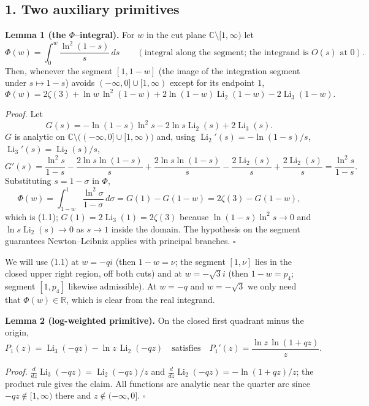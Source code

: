 \documentclass[11pt]{article}
\theoremstyle{remark}
\begin{document}
\subsection*{1. Two auxiliary primitives}

\textbf{Lemma 1 (the $\Phi$--integral).} For $w$ in the cut plane $\mathbb C\setminus[1,\infty)$ let
\[
\Phi(w)=\int_0^w\frac{\ln^2(1-s)}{s}\,ds \qquad(\text{integral along the segment; the integrand is }O(s)\text{ at }0).
\]
Then, whenever the segment $[1,1-w]$ (the image of the integration segment under $s\mapsto 1-s$) avoids $(-\infty,0]\cup[1,\infty)$ except for its endpoint $1$,
\begin{equation*}
\Phi(w)=2\zeta(3)+\ln w\,\ln^2(1-w)+2\ln(1-w)\operatorname{Li}_2(1-w)-2\operatorname{Li}_3(1-w). \tag{1.1}
\end{equation*}

\textit{Proof.} Let
\[
G(s)=-\ln(1-s)\ln^2 s-2\ln s\operatorname{Li}_2(s)+2\operatorname{Li}_3(s).
\]
$G$ is analytic on $\mathbb C\setminus\big((-\infty,0]\cup[1,\infty)\big)$ and, using $\operatorname{Li}_2'(s)=-\ln(1-s)/s$, $\operatorname{Li}_3'(s)=\operatorname{Li}_2(s)/s$,
\[
G'(s)=\frac{\ln^2s}{1-s}-\frac{2\ln s\ln(1-s)}{s}+\frac{2\ln s\ln(1-s)}{s}
-\frac{2\operatorname{Li}_2(s)}{s}+\frac{2\operatorname{Li}_2(s)}{s}=\frac{\ln^2 s}{1-s}.
\]
Substituting $s=1-\sigma$ in $\Phi$,
\[
\Phi(w)=\int_{1-w}^{1}\frac{\ln^2\sigma}{1-\sigma}\,d\sigma=G(1)-G(1-w)=2\zeta(3)-G(1-w),
\]
which is (1.1); $G(1)=2\operatorname{Li}_3(1)=2\zeta(3)$ because $\ln(1-s)\ln^2s\to0$ and $\ln s\operatorname{Li}_2(s)\to 0$ as $s\to1$ inside the domain. The hypothesis on the segment guarantees Newton--Leibniz applies with principal branches. $\square$

We will use (1.1) at $w=-qi$ (then $1-w=\nu$; the segment $[1,\nu]$ lies in the closed upper right region, off both cuts) and at $w=-\sqrt3 i$ (then $1-w=p_4$; segment $[1,p_4]$ likewise admissible). At $w=-q$ and $w=-\sqrt3$ we only need that $\Phi(w)\in\mathbb R$, which is clear from the real integrand.

\textbf{Lemma 2 (log-weighted primitive).} On the closed first quadrant minus the origin,
\[
P_1(z)=\operatorname{Li}_3(-qz)-\ln z\,\operatorname{Li}_2(-qz)
\quad\text{satisfies}\quad P_1'(z)=\frac{\ln z\,\ln(1+qz)}{z}.
\]

\textit{Proof.} $\frac{d}{dz}\operatorname{Li}_3(-qz)=\operatorname{Li}_2(-qz)/z$ and $\frac{d}{dz}\operatorname{Li}_2(-qz)=-\ln(1+qz)/z$; the product rule gives the claim. All functions are analytic near the quarter arc since $-qz\notin[1,\infty)$ there and $z\notin(-\infty,0]$. $\square$
\end{document}

